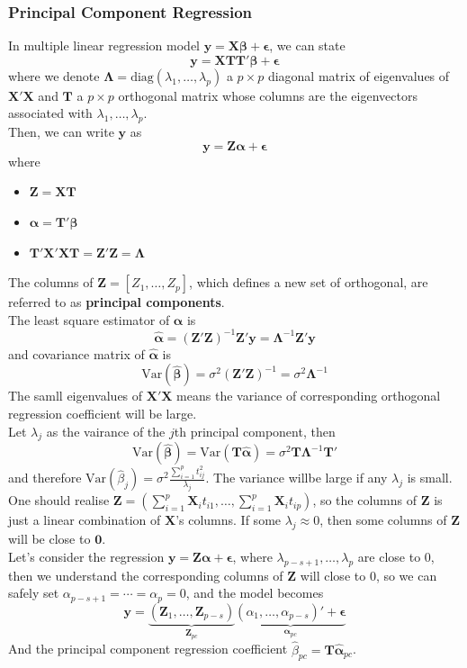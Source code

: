 \documentclass[11pt]{article}
\newcommand{\var}{\mathrm{Var}}
\theoremstyle{definition}
\begin{document}
\subsubsection{Principal Component Regression}
In multiple linear regression model $\bm{y}=\bm{X\beta}+\bm{\epsilon}$, we can state
\[
\bm{y}=\bm{XTT}'\bm{\beta}+\bm{\epsilon}
\]
where we denote $\bm{\Lambda}=\text{diag}(\lambda_1,\ldots, \lambda_p)$ a $p\times p$ diagonal matrix of eigenvalues of $\bm{X}'\bm{X}$ and $\bm{T}$ a $p\times p$ orthogonal matrix whose columns are the eigenvectors associated with $\lambda_1,\ldots, \lambda_p$.\\
Then, we can write $\bm{y}$ as
\[
\bm{y}=\bm{Z\alpha}+\bm{\epsilon}
\]
where
\begin{itemize}
  \item $\bm{Z}=\bm{XT}$
  \item $\bm{\alpha}=\bm{T}'\bm{\beta}$
  \item $\bm{T}'\bm{X}'\bm{XT}=\bm{Z}'\bm{Z}=\bm{\Lambda}$
\end{itemize}
The columns of $\bm{Z}=[Z_1,\ldots, Z_p]$, which defines a new set of orthogonal, are referred to as \textbf{principal components}.\\
The least square estimator of $\bm{\alpha}$ is
\[
\hat{\bm{\alpha}}=(\bm{Z}'\bm{Z})^{-1}\bm{Z}'\bm{y}=\bm{\Lambda}^{-1}\bm{Z}'\bm{y}
\]
and covariance matrix of $\hat{\bm{\alpha}}$ is
\[
\var(\hat{\bm{\beta}})=\sigma^2(\bm{Z}'\bm{Z})^{-1}=\sigma^2\bm{\Lambda}^{-1}
\]
The samll eigenvalues of $\bm{X}'\bm{X}$ means the variance of corresponding orthogonal regression coefficient will be large.\\
Let $\lambda_j$ as the vairance of the $j$th principal component, then
\[
\var(\hat{\bm{\beta}})=\var(\bm{T}\hat{\bm{\alpha}})=\sigma^2\bm{T\Lambda}^{-1}\bm{T}'
\]
and therefore $\var(\hat{\beta}_j)=\sigma^2\frac{\sum_{i=1}^p t_{ij}^2}{\lambda_j}$. The variance willbe large if any $\lambda_j$ is small.\\
One should realise $\bm{Z}=(\sum_{i=1}^p \bm{X}_it_{i1}, \ldots, \sum_{i=1}^p \bm{X}_it_{ip})$, so the columns of $\bm{Z}$ is just a linear combination of $\bm{X}$'s columns. If some $\lambda_j\approx 0$, then some columns of $\bm{Z}$ will be close to $\bm{0}$.\\
Let's consider the regression $\bm{y}=\bm{Z\alpha}+\bm{\epsilon}$, where $\lambda_{p-s+1},\ldots, \lambda_{p}$ are close to $0$, then we understand the corresponding columns of $\bm{Z}$ will close to $0$, so we can safely set $\alpha_{p-s+1}=\cdots=\alpha_{p}=0$, and the model becomes
\[
\bm{y}=\underbrace{(\bm{Z}_1,\ldots, \bm{Z}_{p-s})}_{\bm{Z}_{pc}}\underbrace{(\alpha_1,\ldots, \alpha_{p-s})'+\bm{\epsilon}}_{\bm{\alpha}_{pc}}
\]
And the principal component regression coefficient $\hat{\beta}_{pc}=\bm{T}\hat{\bm{\alpha}}_{pc}$.
\end{document}
